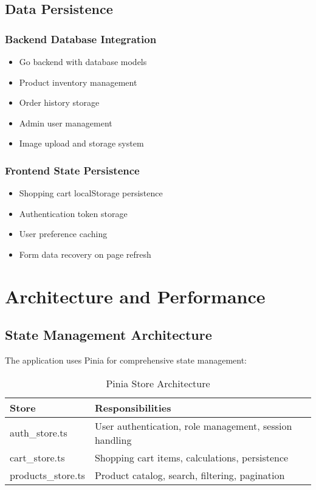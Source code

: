 \documentclass[12pt,a4paper]{article}
\begin{document}
\subsection{Data Persistence}

\subsubsection{Backend Database Integration}
\begin{itemize}
    \item Go backend with database models
    \item Product inventory management
    \item Order history storage
    \item Admin user management
    \item Image upload and storage system
\end{itemize}

\subsubsection{Frontend State Persistence}
\begin{itemize}
    \item Shopping cart localStorage persistence
    \item Authentication token storage
    \item User preference caching
    \item Form data recovery on page refresh
\end{itemize}

\section{Architecture and Performance}

\subsection{State Management Architecture}

The application uses Pinia for comprehensive state management:

\begin{table}[H]
\centering
\begin{tabularx}{\textwidth}{|l|X|}
\hline
\textbf{Store} & \textbf{Responsibilities} \\
\hline
auth\_store.ts & User authentication, role management, session handling \\
cart\_store.ts & Shopping cart items, calculations, persistence \\
products\_store.ts & Product catalog, search, filtering, pagination \\
\hline
\end{tabularx}
\caption{Pinia Store Architecture}
\end{table}
\end{document}
